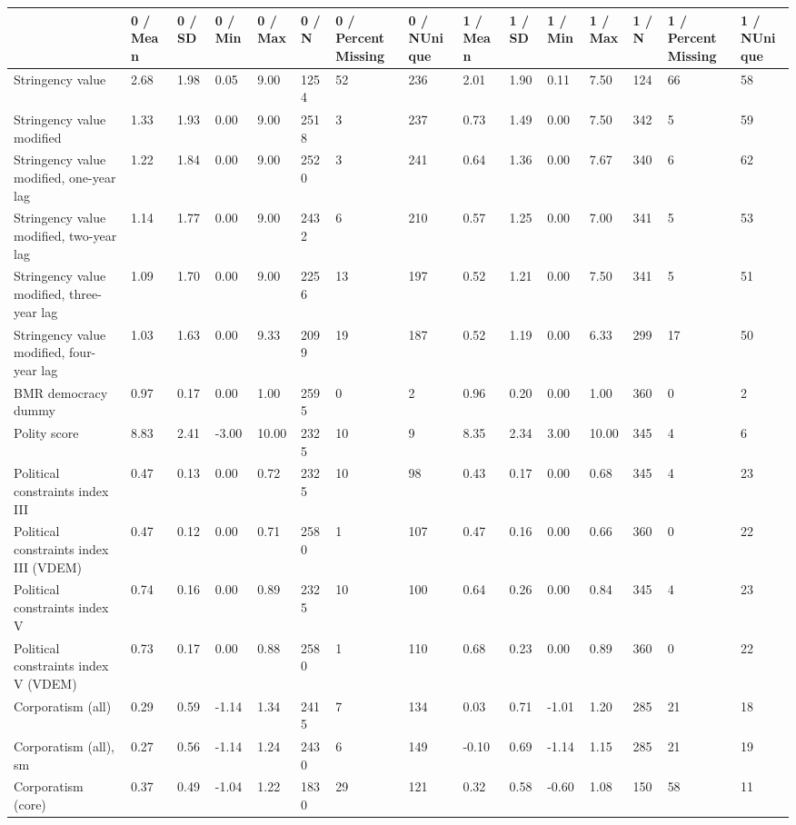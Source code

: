 
\begin{longtable}{lllllllllllllll}
\toprule
  & 0 / Mean & 0 / SD & 0 / Min & 0 / Max & 0 / N & 0 / PercentMissing & 0 / NUnique & 1 / Mean & 1 / SD & 1 / Min & 1 / Max & 1 / N & 1 / PercentMissing & 1 / NUnique\\
\midrule
Stringency value & 2.68 & 1.98 & 0.05 & 9.00 & 1254 & 52 & 236 & 2.01 & 1.90 & 0.11 & 7.50 & 124 & 66 & 58\\
Stringency value modified & 1.33 & 1.93 & 0.00 & 9.00 & 2518 & 3 & 237 & 0.73 & 1.49 & 0.00 & 7.50 & 342 & 5 & 59\\
Stringency value modified, one-year lag & 1.22 & 1.84 & 0.00 & 9.00 & 2520 & 3 & 241 & 0.64 & 1.36 & 0.00 & 7.67 & 340 & 6 & 62\\
Stringency value modified, two-year lag & 1.14 & 1.77 & 0.00 & 9.00 & 2432 & 6 & 210 & 0.57 & 1.25 & 0.00 & 7.00 & 341 & 5 & 53\\
Stringency value modified, three-year lag & 1.09 & 1.70 & 0.00 & 9.00 & 2256 & 13 & 197 & 0.52 & 1.21 & 0.00 & 7.50 & 341 & 5 & 51\\
\addlinespace
Stringency value modified, four-year lag & 1.03 & 1.63 & 0.00 & 9.33 & 2099 & 19 & 187 & 0.52 & 1.19 & 0.00 & 6.33 & 299 & 17 & 50\\
BMR democracy dummy & 0.97 & 0.17 & 0.00 & 1.00 & 2595 & 0 & 2 & 0.96 & 0.20 & 0.00 & 1.00 & 360 & 0 & 2\\
Polity score & 8.83 & 2.41 & -3.00 & 10.00 & 2325 & 10 & 9 & 8.35 & 2.34 & 3.00 & 10.00 & 345 & 4 & 6\\
Political constraints index III & 0.47 & 0.13 & 0.00 & 0.72 & 2325 & 10 & 98 & 0.43 & 0.17 & 0.00 & 0.68 & 345 & 4 & 23\\
Political constraints index III (VDEM) & 0.47 & 0.12 & 0.00 & 0.71 & 2580 & 1 & 107 & 0.47 & 0.16 & 0.00 & 0.66 & 360 & 0 & 22\\
\addlinespace
Political constraints index V & 0.74 & 0.16 & 0.00 & 0.89 & 2325 & 10 & 100 & 0.64 & 0.26 & 0.00 & 0.84 & 345 & 4 & 23\\
Political constraints index V (VDEM) & 0.73 & 0.17 & 0.00 & 0.88 & 2580 & 1 & 110 & 0.68 & 0.23 & 0.00 & 0.89 & 360 & 0 & 22\\
Corporatism (all) & 0.29 & 0.59 & -1.14 & 1.34 & 2415 & 7 & 134 & 0.03 & 0.71 & -1.01 & 1.20 & 285 & 21 & 18\\
Corporatism (all), sm & 0.27 & 0.56 & -1.14 & 1.24 & 2430 & 6 & 149 & -0.10 & 0.69 & -1.14 & 1.15 & 285 & 21 & 19\\
Corporatism (core) & 0.37 & 0.49 & -1.04 & 1.22 & 1830 & 29 & 121 & 0.32 & 0.58 & -0.60 & 1.08 & 150 & 58 & 11\\

\end{longtable}

